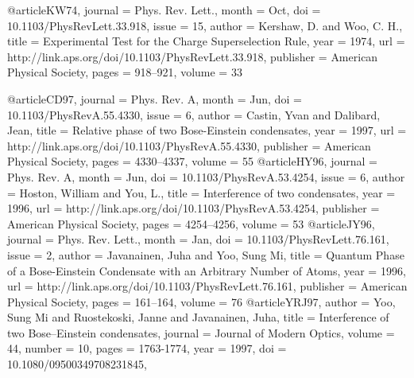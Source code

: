 @article{KW74,
  journal = {Phys. Rev. Lett.},
  month = {Oct},
  doi = {10.1103/PhysRevLett.33.918},
  issue = {15},
  author = {Kershaw, D. and Woo, C. H.},
  title = {Experimental Test for the Charge Superselection Rule},
  year = {1974},
  url = {http://link.aps.org/doi/10.1103/PhysRevLett.33.918},
  publisher = {American Physical Society},
  pages = {918--921},
  volume = {33}
}

@article{CD97,
  journal = {Phys. Rev. A},
  month = {Jun},
  doi = {10.1103/PhysRevA.55.4330},
  issue = {6},
  author = {Castin, Yvan and Dalibard, Jean},
  title = {Relative phase of two Bose-Einstein condensates},
  year = {1997},
  url = {http://link.aps.org/doi/10.1103/PhysRevA.55.4330},
  publisher = {American Physical Society},
  pages = {4330--4337},
  volume = {55}
}
@article{HY96,
  journal = {Phys. Rev. A},
  month = {Jun},
  doi = {10.1103/PhysRevA.53.4254},
  issue = {6},
  author = {Hoston, William and You, L.},
  title = {Interference of two condensates},
  year = {1996},
  url = {http://link.aps.org/doi/10.1103/PhysRevA.53.4254},
  publisher = {American Physical Society},
  pages = {4254--4256},
  volume = {53}
}
@article{JY96,
  journal = {Phys. Rev. Lett.},
  month = {Jan},
  doi = {10.1103/PhysRevLett.76.161},
  issue = {2},
  author = {Javanainen, Juha and Yoo, Sung Mi},
  title = {Quantum Phase of a Bose-Einstein Condensate with an Arbitrary Number of Atoms},
  year = {1996},
  url = {http://link.aps.org/doi/10.1103/PhysRevLett.76.161},
  publisher = {American Physical Society},
  pages = {161--164},
  volume = {76}
}
@article{YRJ97,
author = {Yoo, Sung   Mi and Ruostekoski, Janne and Javanainen, Juha},
title = {Interference of two Bose–Einstein condensates},
journal = {Journal of Modern Optics},
volume = {44},
number = {10},
pages = {1763-1774},
year = {1997},
doi = {10.1080/09500349708231845},
}

